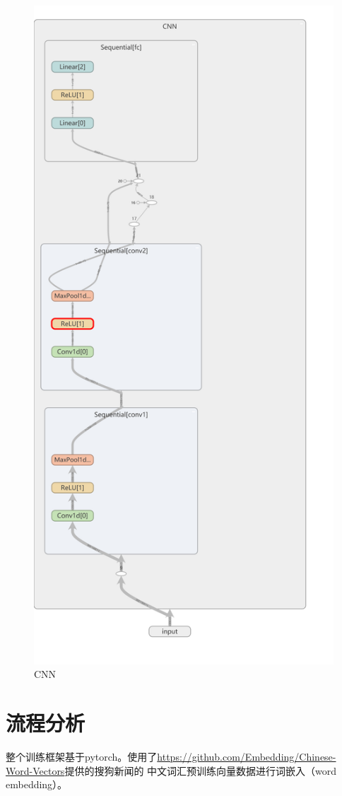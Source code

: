 \documentclass[a4paper]{article}
\begin{document}
    \begin{figure}[H]
        \centering
        \includegraphics[width=.75\linewidth]{assets/cnn.png}
        \caption{CNN}
    \end{figure}

    \newpage

    \section{流程分析}
    整个训练框架基于pytorch。使用了\url{https://github.com/Embedding/Chinese-Word-Vectors}提供的搜狗新闻的
    中文词汇预训练向量数据进行词嵌入（word embedding）。
    
\end{document}
